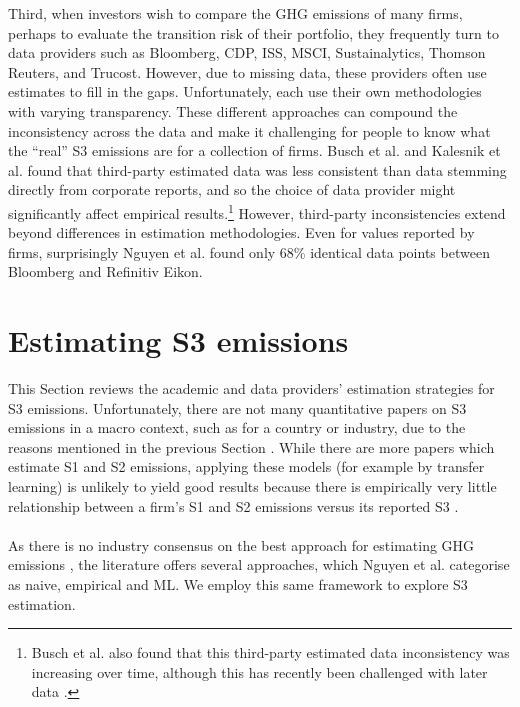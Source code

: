 \documentclass[12pt,twoside]{report}
\begin{document}
Third, when investors wish to compare the GHG emissions of many firms, perhaps to evaluate the transition risk of their portfolio, they frequently turn to data providers such as Bloomberg, CDP, ISS, MSCI, Sustainalytics, Thomson Reuters, and Trucost. However, due to missing data, these providers often use estimates to fill in the gaps. Unfortunately, each use their own methodologies with varying transparency. These different approaches can compound the inconsistency across the data and make it challenging for people to know what the ``real'' S3 emissions are for a collection of firms. Busch et al. \cite{Busch2022} and Kalesnik et al. \cite{KalesnikVitali2022}  found that third-party estimated data was less consistent than data stemming directly from corporate reports, and so the choice of data provider might significantly affect empirical results.\footnote{Busch et al. also found that this third-party estimated data inconsistency was increasing over time, although this has recently been challenged with later data \cite{Swinkels2024}.} However, third-party inconsistencies extend beyond differences in estimation methodologies. Even for values reported by firms, surprisingly Nguyen et al. \cite{Nguyenetal2023} found only 68\% identical data points between Bloomberg and Refinitiv Eikon. 

\section{Estimating S3 emissions}\label{sec:Scope3Modelling}

This Section reviews the academic and data providers' estimation strategies for S3 emissions. Unfortunately, there are not many quantitative papers on S3 emissions in a macro context, such as for a country or industry, due to the reasons mentioned in the previous Section \cite{Hettler2024}. While there are more papers which estimate S1 and S2 emissions, applying these models (for example by transfer learning) is unlikely to yield good results because there is empirically very little relationship between a firm's S1 and S2 emissions versus its reported S3 \cite{ManGroup2022}.   
\\ \\
As there is no industry consensus on the best approach for estimating GHG emissions \cite{FTSERussell2022}, the literature offers several approaches, which Nguyen et al. \cite{nguyen2021} categorise as naive, empirical and ML. We employ this same framework to explore S3 estimation. 
\end{document}
